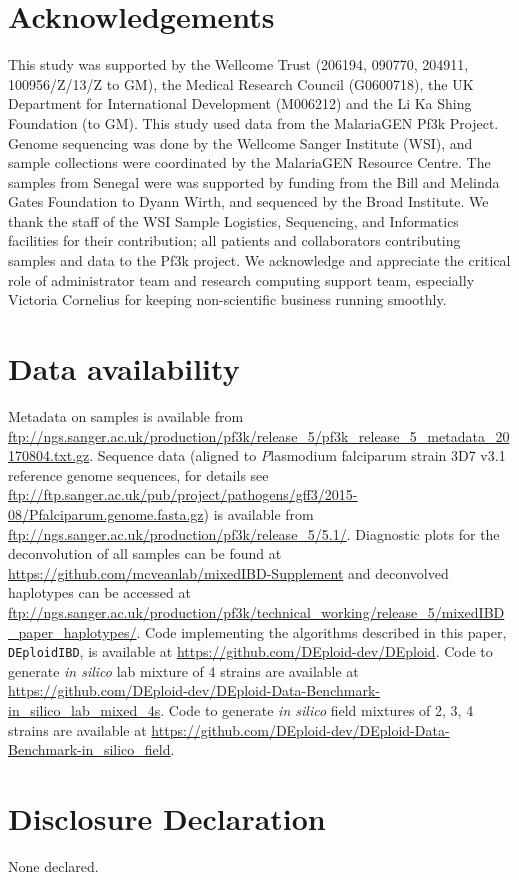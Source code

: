 \documentclass[9pt,lineno]{elife}
\begin{document}
\section{Acknowledgements}
This study was supported by the Wellcome Trust (206194, 090770, 204911, 100956/Z/13/Z to GM), the Medical Research Council (G0600718), the UK Department for International Development (M006212) and the Li Ka Shing Foundation (to GM). This study used data from the MalariaGEN Pf3k Project. Genome sequencing was done by the Wellcome Sanger Institute (WSI), and sample collections were coordinated by the MalariaGEN Resource Centre. The samples from Senegal were was supported by funding from the Bill and Melinda Gates Foundation to Dyann Wirth, and sequenced by the Broad Institute. We thank the staff of the WSI Sample Logistics, Sequencing, and Informatics facilities for their contribution; all patients and collaborators contributing samples and data to the Pf3k project. We acknowledge and appreciate the critical role of administrator team and research computing support team, especially Victoria Cornelius for keeping non-scientific business running smoothly.


\section{Data availability}
Metadata on samples is available from \url{ftp://ngs.sanger.ac.uk/production/pf3k/release_5/pf3k_release_5_metadata_20170804.txt.gz}.  Sequence data (aligned to {\emph Plasmodium falciparum} strain 3D7 v3.1 reference genome sequences, for details see \url{      ftp://ftp.sanger.ac.uk/pub/project/pathogens/gff3/2015-08/Pfalciparum.genome.fasta.gz}) is available from  \url{ftp://ngs.sanger.ac.uk/production/pf3k/release_5/5.1/}.  Diagnostic plots for the deconvolution of all samples can be found at \url{https://github.com/mcveanlab/mixedIBD-Supplement} and deconvolved haplotypes can be accessed at \url{ftp://ngs.sanger.ac.uk/production/pf3k/technical_working/release_5/mixedIBD_paper_haplotypes/}. Code implementing the algorithms described in this paper, \texttt{DEploidIBD}, is available at \url{https://github.com/DEploid-dev/DEploid}. Code to generate {\it in silico} lab mixture of 4 strains are available at \url{https://github.com/DEploid-dev/DEploid-Data-Benchmark-in_silico_lab_mixed_4s}. Code to generate {\it in silico} field mixtures of 2, 3, 4 strains are available at \url{https://github.com/DEploid-dev/DEploid-Data-Benchmark-in_silico_field}.



\section{Disclosure Declaration}
None declared.



\end{document}
